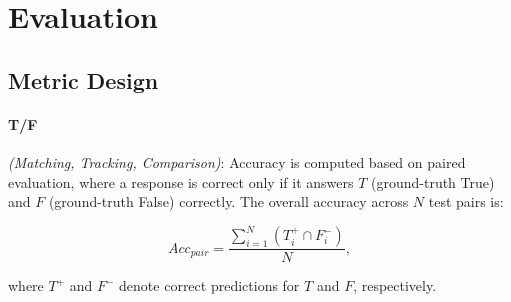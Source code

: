 

\section{Evaluation }
\subsection{Metric Design}
\label{metrics}

\paragraph{T/F}  \textit{(Matching, Tracking, Comparison)}: Accuracy is computed based on paired evaluation, where a response is correct only if it answers \(T\) (ground-truth True) and \(F\) (ground-truth False) correctly. The overall accuracy across \(N\) test pairs is:

\begin{equation}
    Acc_{pair} = \frac{\sum_{i=1}^{N} \left( T_i^+ \cap F_i^- \right)}{N},
\end{equation}

\noindent where \( T^+ \) and \( F^- \) denote correct predictions for \(T\) and \(F\), respectively.








